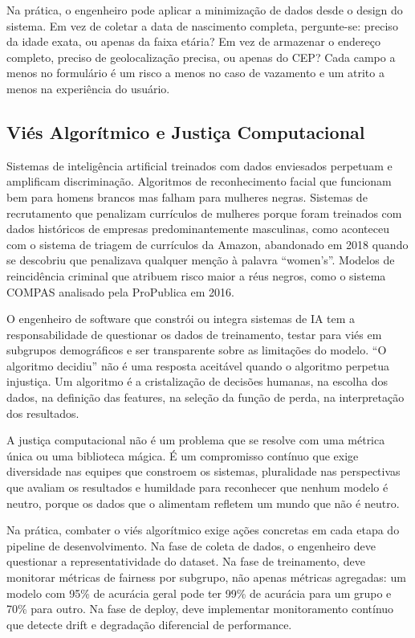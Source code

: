 Na prática, o engenheiro pode aplicar a minimização de dados desde o
design do sistema. Em vez de coletar a data de nascimento completa,
pergunte-se: preciso da idade exata, ou apenas da faixa etária? Em vez
de armazenar o endereço completo, preciso de geolocalização precisa, ou
apenas do CEP? Cada campo a menos no formulário é um risco a menos no
caso de vazamento e um atrito a menos na experiência do usuário.

\subsection{Viés Algorítmico e Justiça Computacional}

Sistemas de inteligência artificial treinados com dados enviesados
perpetuam e amplificam discriminação. Algoritmos de reconhecimento
facial que funcionam bem para homens brancos mas falham para mulheres
negras. Sistemas de recrutamento que penalizam currículos de mulheres
porque foram treinados com dados históricos de empresas predominantemente
masculinas, como aconteceu com o sistema de triagem de currículos da
Amazon, abandonado em 2018 quando se descobriu que penalizava qualquer
menção à palavra ``women's''. Modelos de reincidência criminal que
atribuem risco maior a réus negros, como o sistema COMPAS analisado
pela ProPublica em 2016.

O engenheiro de software que constrói ou integra sistemas de IA tem a
responsabilidade de questionar os dados de treinamento, testar para viés
em subgrupos demográficos e ser transparente sobre as limitações do
modelo. ``O algoritmo decidiu'' não é uma resposta aceitável quando o
algoritmo perpetua injustiça. Um algoritmo é a cristalização de decisões
humanas, na escolha dos dados, na definição das features, na seleção
da função de perda, na interpretação dos resultados.

A justiça computacional não é um problema que se resolve com uma métrica
única ou uma biblioteca mágica. É um compromisso contínuo que exige
diversidade nas equipes que constroem os sistemas, pluralidade nas
perspectivas que avaliam os resultados e humildade para reconhecer que
nenhum modelo é neutro, porque os dados que o alimentam refletem um
mundo que não é neutro.

Na prática, combater o viés algorítmico exige ações concretas em cada
etapa do pipeline de desenvolvimento. Na fase de coleta de dados, o
engenheiro deve questionar a representatividade do dataset. Na fase de
treinamento, deve monitorar métricas de fairness por subgrupo, não
apenas métricas agregadas: um modelo com 95\% de acurácia geral pode
ter 99\% de acurácia para um grupo e 70\% para outro. Na fase de deploy,
deve implementar monitoramento contínuo que detecte drift e degradação
diferencial de performance.

